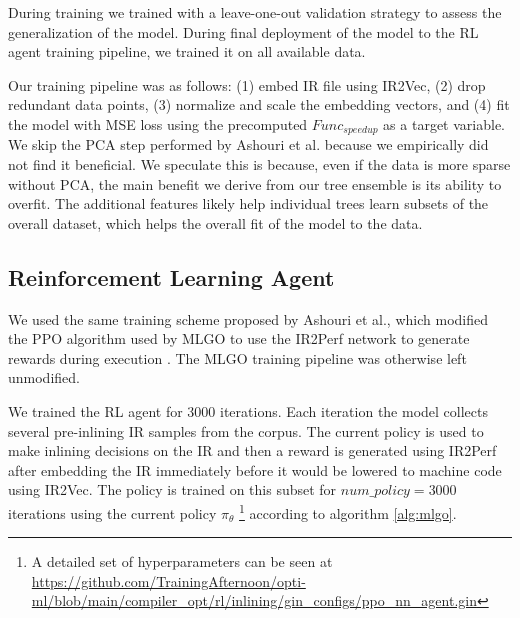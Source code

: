 \documentclass[nohyperref]{article}
\theoremstyle{plain}
\theoremstyle{definition}
\theoremstyle{remark}
\begin{document}
During training we trained with a leave-one-out validation strategy to assess the generalization of the model. During final deployment of the model to the RL agent training pipeline, we trained it on all available data.


Our training pipeline was as follows: (1) embed IR file using IR2Vec, (2) drop redundant data points, (3) normalize and scale the embedding vectors, and (4) fit the model with MSE loss using the precomputed $Func_{speedup}$ as a target variable. We skip the PCA step performed by Ashouri et al. because we empirically did not find it beneficial. We speculate this is because, even if the data is more sparse without PCA, the main benefit we derive from our tree ensemble is its ability to overfit. The additional features likely help individual trees learn subsets of the overall dataset, which helps the overall fit of the model to the data.

\subsection{Reinforcement Learning Agent}

We used the same training scheme proposed by Ashouri et al., which modified the PPO algorithm used by MLGO to use the IR2Perf network to generate rewards during execution \cite{mlgoperf}. The MLGO training pipeline was otherwise left unmodified.

We trained the RL agent for 3000 iterations. Each iteration the model collects several pre-inlining IR samples from the corpus. The current policy is used to make inlining decisions on the IR and then a reward is generated using IR2Perf after embedding the IR immediately before it would be lowered to machine code using IR2Vec. The policy is trained on this subset for $num\_policy=3000$ iterations using the current policy $\pi_{\theta}$ \footnote{A detailed set of hyperparameters can be seen at \href{https://github.com/TrainingAfternoon/opti-ml/blob/main/compiler\_opt/rl/inlining/gin\_configs/ppo\_nn\_agent.gin}{https://github.com/TrainingAfternoon/opti-ml/blob/main/compiler\_opt/rl/inlining/gin\_configs/ppo\_nn\_agent.gin}} according to algorithm \ref{alg:mlgo}.
\end{document}
